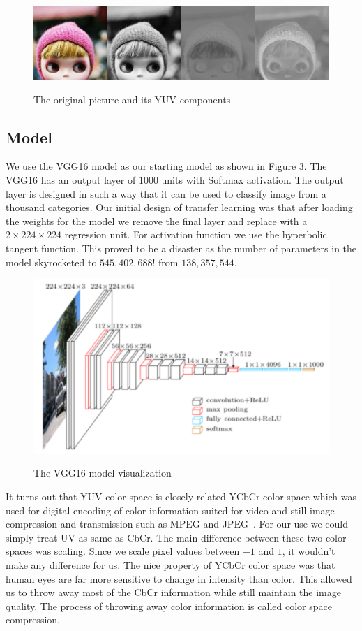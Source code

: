 \documentclass[12pt]{article}
\begin{document}
\begin{figure}[!ht]
 \centering
  \includegraphics[width=5.0in]{resource/YUV.png}
 \label{yuvimage}
 \caption{The original picture and its YUV components}
\end{figure}


\subsection{Model}
We use the VGG16 model as our starting model as shown in Figure 3. The VGG16 has an output layer of $1000$ units with Softmax activation. The output layer is designed in such a way that it can be used to classify image from a thousand categories. Our initial design of transfer learning was that after loading the weights for the model we remove the final layer and replace with a $2\times224\times224$ regression unit. For activation function we use the hyperbolic tangent function. This proved to be a disaster as the number of parameters in the model skyrocketed to $545,402,688$! from  $138,357,544$. 


\begin{figure}[H]
 \centering
  \includegraphics[width=5.0in]{resource/vgg16.png}
\center
\label{fig:vggvis}
 \caption{The VGG16 model visualization}
\end{figure}

It turns out that YUV color space is closely related YCbCr color space which was used for digital encoding of color information suited for video and still-image compression and transmission such as MPEG and JPEG~\cite{YUVWIKI}. For our use we could simply treat UV as same as CbCr. The main difference between these two color spaces was scaling. Since we scale pixel values between $-1$ and $1$, it wouldn't make any difference for us. The nice property of YCbCr color space was that human eyes are far more sensitive to change in intensity than color. This allowed us to throw away most of the CbCr information while still maintain the image quality. The process of throwing away color information is called color space compression. 
\end{document}
